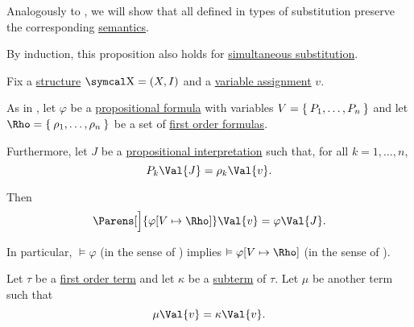 \begin{proposition}\label{thm:first_order_substitution_equivalence}
  Analogously to , we will show that all defined in  types of substitution preserve the corresponding \hyperref[def:first_order_semantics]{semantics}.

  By induction, this proposition also holds for \hyperref[def:propositional_substitution/simultaneous]{simultaneous substitution}.

  Fix a \hyperref[def:first_order_structure]{structure} \( \CX = (X, I) \) and a \hyperref[def:first_order_valuation/variable_assignment]{variable assignment} \( v \).

  \begin{PropEnum}
     As in , let \( \varphi \) be a \hyperref[def:propositional_language/formula]{propositional formula} with variables \( {V = \Set{ P_1, \ldots, P_n }} \) and let \( \Rho = \Set{ \rho_1, \ldots, \rho_n } \) be a set of \hyperref[def:first_order_language/formula]{first order formulas}.

    Furthermore, let \( J \) be a \hyperref[def:propositional_valuation/interpretation]{propositional interpretation} such that, for all \( k = 1, \ldots, n \),
    \begin{equation}\label{eq:thm:first_order_substitution_equivalence/propositional/compatibility}
      P_k\Val{J} = \rho_k\Val{v}.
    \end{equation}

    Then
    \begin{equation}\label{eq:thm:first_order_substitution_equivalence/propositional}
      \Parens[\Big]{ \varphi[V \mapsto \Rho] }\Val{v} = \varphi \Val{J}.
    \end{equation}

    In particular, \( \vDash \varphi \) (in the sense of ) implies \( \vDash \varphi[V \mapsto \Rho] \) (in the sense of ).

     Let \( \tau \) be a \hyperref[def:first_order_language/term]{first order term} and let \( \kappa \) be a \hyperref[def:first_order_language/subterm]{subterm} of \( \tau \). Let \( \mu \) be another term such that
    \begin{equation}\label{eq:thm:first_order_substitution_equivalence/term_in_term/compatibility}
      \mu\Val{v} = \kappa\Val{v}.
    \end{equation}


\end{PropEnum}
\end{proposition}
